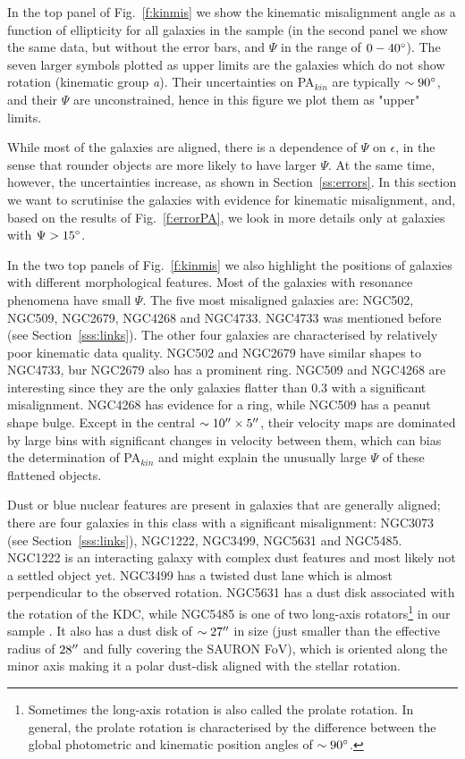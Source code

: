 \documentclass[usenatbib,usegraphicx]{mn2e}
\begin{document}
In the top panel of Fig.~\ref{f:kinmis} we show the kinematic misalignment angle as a function of ellipticity for all galaxies in the sample (in the second panel we show the same data, but without the error bars, and $\Psi$ in the range of $0-40\hbox{$^\circ$}$). The seven larger symbols plotted as upper limits are the galaxies which do not show rotation (kinematic group {\it a}). Their uncertainties on PA$_{kin}$ are typically $\sim90\hbox{$^\circ$}$, and their $\Psi$ are unconstrained, hence in this figure we plot them as "upper" limits. 

While most of the galaxies are aligned, there is a dependence of  $\Psi$ on $\epsilon$, in the sense that rounder objects are more likely to have larger $\Psi$. At the same time, however, the uncertainties increase, as shown in Section~\ref{ss:errors}.  In this section we want to scrutinise the galaxies with evidence for kinematic misalignment, and, based on the results of Fig.~\ref{f:errorPA}, we look in more details only at galaxies with $\Psi>15\hbox{$^\circ$}$.

In the two top panels of Fig.~\ref{f:kinmis} we also highlight the positions of galaxies with different morphological features. Most of the galaxies with resonance phenomena have small $\Psi$.  The five most misaligned galaxies are: NGC502, NGC509, NGC2679, NGC4268 and NGC4733. NGC4733 was mentioned before (see Section~\ref{sss:links}). The other four galaxies are characterised by relatively poor kinematic data quality. NGC502 and NGC2679 have similar shapes to NGC4733, bur NGC2679 also has a prominent ring.  NGC509 and NGC4268 are interesting since they are the only galaxies flatter than 0.3 with a significant misalignment. NGC4268 has evidence for a ring, while NGC509 has a peanut shape bulge. Except in the central $\sim10\hbox{$^{\prime\prime}$} \times5\hbox{$^{\prime\prime}$}$, their velocity maps are dominated by large bins with significant changes in velocity between them, which can bias the determination of PA$_{kin}$ and might explain the unusually large $\Psi$ of these flattened objects. 

Dust or blue nuclear features are present in galaxies that are generally aligned; there are four galaxies in this class with a significant misalignment: NGC3073 (see Section~\ref{sss:links}), NGC1222, NGC3499, NGC5631 and NGC5485.  NGC1222 is an interacting galaxy with complex dust features and most likely not a settled object yet. NGC3499 has a twisted dust lane which is almost perpendicular to the observed rotation. NGC5631 has a dust disk associated with the rotation of the KDC, while NGC5485 is one of two long-axis rotators\footnote{Sometimes the long-axis rotation is also called the prolate rotation. In general, the prolate rotation is characterised by the difference between the global photometric and kinematic position angles of $\sim 90\hbox{$^\circ$}$.} in our sample \citep{1988A&A...195L...5W}. It also has a dust disk of $\sim27\hbox{$^{\prime\prime}$}$ in size (just smaller than the effective radius of $28\hbox{$^{\prime\prime}$}$ and fully covering the SAURON FoV), which is oriented along the minor axis making it a polar dust-disk aligned with the stellar rotation. 
\end{document}
